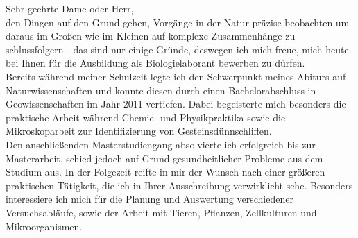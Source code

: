 \documentclass[11pt,a4paper,roman]{moderncv}
\begin{document}
Sehr geehrte Dame oder Herr,\\
den Dingen auf den Grund gehen, Vorgänge in der Natur präzise beobachten um daraus im Großen wie im Kleinen auf komplexe Zusammenhänge zu schlussfolgern - das sind nur einige Gründe, deswegen ich mich freue, mich heute bei Ihnen für die Ausbildung als Biologielaborant bewerben zu dürfen.\\
\vspace{5mm}
Bereits während meiner Schulzeit legte ich den Schwerpunkt meines Abiturs auf Naturwissenschaften und konnte diesen durch einen Bachelorabschluss in Geowissenschaften im Jahr 2011 vertiefen. Dabei begeisterte mich besonders die praktische Arbeit während Chemie- und Physikpraktika sowie die Mikroskoparbeit zur Identifizierung von Gesteinsdünnschliffen.\\
Den anschließenden Masterstudiengang absolvierte ich erfolgreich bis zur Masterarbeit, schied jedoch auf Grund gesundheitlicher Probleme aus dem Studium aus. In der Folgezeit reifte in mir der Wunsch nach einer größeren praktischen Tätigkeit, die ich in Ihrer Ausschreibung verwirklicht sehe.
Besonders interessiere ich mich für die Planung und Auswertung verschiedener Versuchsabläufe, sowie der  Arbeit mit Tieren, Pflanzen, Zellkulturen und Mikroorganismen.\\
\vspace{5mm}
\end{document}
